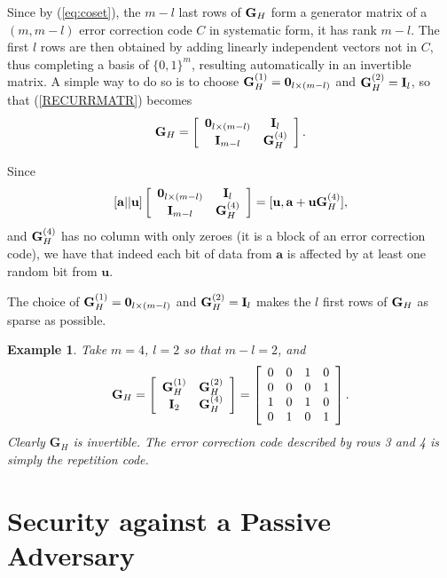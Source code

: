 \documentclass{article}[11pt]
\newcommand{\av}{\mathbf{a}}
\newcommand{\uv}{\mathbf{u}}
\newcommand{\gm}{\mathbf{G}}
\newtheorem{example}{Example}
\begin{document}
Since by (\ref{eq:coset}), the $m-l$ last rows of ${\bf G}_H$ form a generator
matrix of a $(m,m-l)$ error correction code $C$ in systematic form, it has rank
$m-l$. The first $l$ rows are then obtained by adding linearly independent vectors
not in $C$, thus completing a basis of $\{0,1\}^m$, resulting automatically in an
invertible matrix. A simple way to do so is to choose
${\bf G}_H^{(1)}={\bf 0}_{l\times(m-l)}$ and ${\bf G}_H^{(2)}={\bf I}_l$, so that
(\ref{RECURRMATR}) becomes
\[
{\bf G}_H =
\left[
\begin{array}{cc}
{\bf 0}_{l\times(m-l)} & {\bf I}_l \\
{\bf I}_{m-l} & {\bf G}_H^{(4)}
\end{array}
\right].
\]

Since
\[
[\av||\uv]
\left[
\begin{array}{cc}
{\bf 0}_{l\times(m-l)} & {\bf I}_l \\
{\bf I}_{m-l} & {\bf G}_H^{(4)}
\end{array}
\right]=[\uv,\av+\uv{\bf G}_H^{(4)}],
\]
and ${\bf G}_H^{(4)}$ has no column with only zeroes (it is a block of an error correction code),
we have that indeed each bit of data from $\av$ is affected by at least one random
bit from $\uv$.

The choice of ${\bf G}_H^{(1)}={\bf 0}_{l\times(m-l)}$ and ${\bf G}_H^{(2)}={\bf I}_l$ makes
the $l$ first rows of ${\bf G}_H$ as sparse as possible.

\begin{example}\rm
Take $m=4$, $l=2$ so that $m-l=2$, and
\[
{\bf G}_H =
\left[
\begin{array}{cc}
{\bf G}_H^{(1)} & {\bf G}_H^{(2)} \\
{\bf I}_2 & {\bf G}_H^{(4)}
\end{array}
\right] =
\left[
\begin{array}{cccc}
0 & 0 & 1 & 0 \\
0 & 0 & 0 & 1 \\
1 & 0 & 1 & 0 \\
0 & 1 & 0 & 1
\end{array}
\right].
\]
Clearly $\gm_H$ is invertible. The error correction code described by rows 3 and 4
is simply the repetition code.
\end{example}



\section{Security against a Passive Adversary}
\label{sec:passive}
\end{document}
